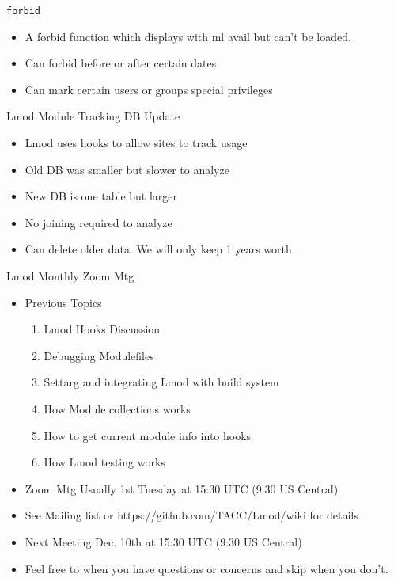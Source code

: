 \documentclass{beamer}
\begin{document}
\begin{frame}{\texttt{forbid{}}}
  \begin{itemize}
    \item A forbid function which displays with ml avail but can't be loaded.
    \item Can forbid before or after certain dates
    \item Can mark certain users or groups special privileges
  \end{itemize}
\end{frame}

\begin{frame}{Lmod Module Tracking DB Update }
  \begin{itemize}
    \item Lmod uses hooks to allow sites to track usage
    \item Old DB was smaller but slower to analyze
    \item New DB is one table but larger
    \item No joining required to analyze
    \item Can delete older data. We will only keep 1 years worth
  \end{itemize}
\end{frame}

\begin{frame}{Lmod Monthly Zoom Mtg}
  \begin{itemize}
    \item Previous Topics
      \begin{enumerate}
        \item Lmod Hooks Discussion
        \item Debugging Modulefiles
        \item Settarg and integrating Lmod with build system
        \item How Module collections works 
        \item How to get current module info into hooks
        \item How Lmod testing works
      \end{enumerate}
    \item Zoom Mtg Usually 1st Tuesday at 15:30 UTC (9:30 US Central)
    \item See Mailing list or https://github.com/TACC/Lmod/wiki for
      details
    \item Next Meeting Dec. 10th at 15:30 UTC (9:30 US Central)
    \item Feel free to when you have questions or concerns and skip
      when you don't.
  \end{itemize}
\end{frame}
\end{document}
